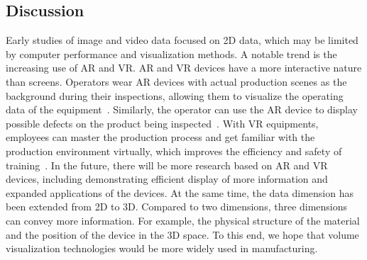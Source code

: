 \documentclass[a4paper,fleqn]{cas-dc}
\begin{document}
\subsection{Discussion}
Early studies of image and video data focused on 2D data, which may be limited by computer performance and visualization methods. A notable trend is the increasing use of AR and VR. 
AR and VR devices have a more interactive nature than screens. Operators wear AR devices with actual production scenes as the background during their inspections, allowing them to visualize the operating data of the equipment~\cite{Satkowski2021}. Similarly, the operator can use the AR device to display possible defects on the product being inspected~\cite{Murithi2020}. With VR equipments, employees can master the production process and get familiar with the production environment virtually, which improves the efficiency and safety of training~\cite{hamid2014virtual}. In the future, there will be more research based on AR and VR devices, including demonstrating efficient display of more information and expanded applications of the devices.
At the same time, the data dimension has been extended from 2D to 3D. Compared to two dimensions, three dimensions can convey more information. For example, the physical structure of the material and the position of the device in the 3D space. To this end, we hope that volume visualization technologies would be more widely used in manufacturing.

\end{document}
